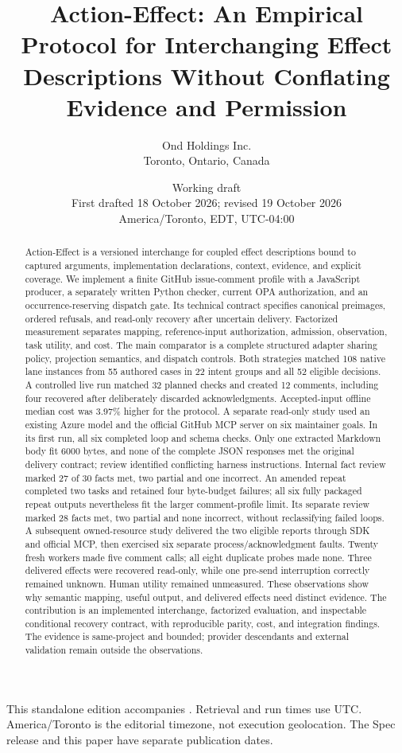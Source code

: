 \documentclass[11pt,letterpaper]{article}
\title{Action-Effect: An Empirical Protocol for Interchanging Effect
Descriptions Without Conflating Evidence and Permission}
\author{Ond Holdings Inc.\\Toronto, Ontario, Canada}
\date{Working draft\\
  First drafted 18 October 2026; revised 19 October 2026\\
  America/Toronto, EDT, UTC-04:00}
\begin{document}
\maketitle

\noindent{}

\smallskip
\noindent This standalone edition accompanies . Retrieval
and run times use UTC. America/Toronto is the editorial timezone, not execution
geolocation. The Spec release and this paper have separate publication dates.

\begin{abstract}
Action-Effect is a versioned interchange for coupled effect descriptions bound
to captured arguments, implementation declarations, context, evidence, and
explicit coverage. We implement a finite GitHub issue-comment profile with a
JavaScript producer, a separately written Python checker, current OPA
authorization, and an occurrence-reserving dispatch gate. Its technical contract
specifies canonical preimages, ordered refusals, and read-only recovery after
uncertain delivery. Factorized measurement separates mapping, reference-input
authorization, admission, observation, task utility, and cost. The main
comparator is a complete structured adapter sharing policy, projection semantics,
and dispatch controls. Both strategies matched 108 native lane instances from
55 authored cases in 22 intent groups and all 52 eligible decisions. A controlled
live run matched 32 planned checks and created 12 comments, including four
recovered after deliberately discarded acknowledgments. Accepted-input offline
median cost was 3.97\% higher for the protocol. A separate read-only study used
an existing Azure model and the official GitHub MCP server on six maintainer
goals. In its first run, all six completed loop and schema checks.
Only one extracted Markdown body fit 6000 bytes, and none of the complete JSON
responses met the original delivery contract; review identified conflicting
harness instructions. Internal fact review marked 27 of 30 facts met, two
partial and one incorrect. An amended repeat completed two tasks and retained
four byte-budget failures; all six fully packaged repeat outputs nevertheless
fit the larger comment-profile limit. Its separate review marked 28 facts met,
two partial and none incorrect, without reclassifying failed loops.
A subsequent owned-resource study delivered the two eligible reports through
SDK and official MCP, then exercised six separate process/acknowledgment faults.
Twenty fresh workers made five comment calls; all eight duplicate probes made
none. Three delivered effects were recovered read-only, while one pre-send
interruption correctly remained unknown. Human utility remained unmeasured.
These observations show why semantic mapping, useful
output, and delivered effects need distinct evidence. The contribution is an
implemented interchange, factorized evaluation, and inspectable conditional
recovery contract, with reproducible parity, cost, and integration findings.
The evidence is same-project and bounded; provider descendants and external
validation remain outside the observations.
\end{abstract}
\end{document}
